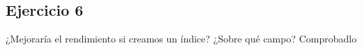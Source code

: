 \begin{lstlisting}

\end{lstlisting}

\subsection{Ejercicio 6}

¿Mejoraría el rendimiento si creamos un índice? ¿Sobre qué campo? Comprobadlo

\begin{lstlisting}

\end{lstlisting}

\begin{lstlisting}

\end{lstlisting}




